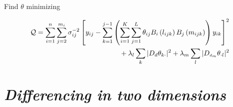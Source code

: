 \documentclass[12pt]{article}
\newcommand{\ms}{\scriptscriptstyle}
\theoremstyle{definition}
\begin{document}
Find $\theta$ minimizing

\begin{align*}\label{eq:unfolded-row-column-difference-penalty}
\mathcal{Q}=\sum_{i=1}^n \sum_{j=2}^{m_i} \sigma_{ij}^{-2} \left[y_{ij} - \sum_{k=1}^{j-1}\left(\sum_{i=1}^K \sum_{j=1}^L \theta_{ij} B_{i}\left(l_{ijk}\right) B_{j}\left( m_{ijk} \right)  \right) y_{ik} \right]^2 \\
\mbox{\;\;\;\;\;\;\;\;}+ \lambda_l \sum_{k} \vert D_d \theta_{k \cdot} \vert^2 + \lambda_m \sum_{l} \vert D_{\ms d_{\ms m}} \theta_{\cdot l} \vert^2 
\end{align*}

 
%



 
\section{\emph{Differencing in two dimensions}}
\end{document}
